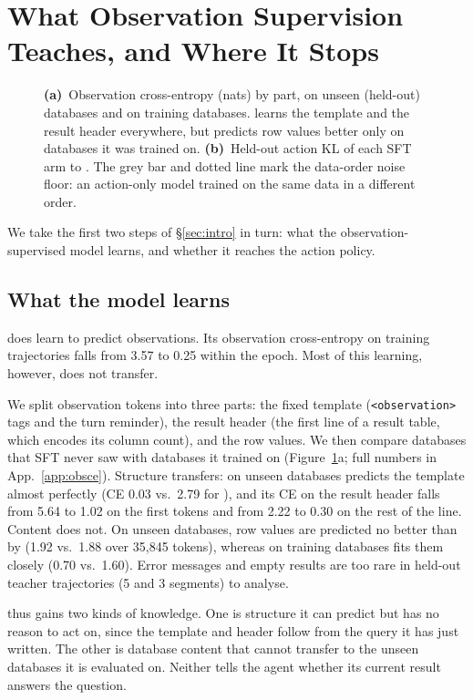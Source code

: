 \section{What Observation Supervision Teaches, and Where It Stops}
\label{sec:mechanism}

\begin{figure}[t]
\centering
{}
\caption{\textbf{(a)}~Observation cross-entropy (nats) by part, on unseen (held-out) databases and on training databases. \armB{} learns the template and the result header everywhere, but predicts row values better only on databases it was trained on. \textbf{(b)}~Held-out action KL of each SFT arm to \armA{}. The grey bar and dotted line mark the data-order noise floor: an action-only model trained on the same data in a different order.}
\label{fig:mechanism}
\end{figure}

We take the first two steps of \S\ref{sec:intro} in turn: what the observation-supervised model learns, and whether it reaches the action policy.

\subsection{What the model learns}
\label{sec:learned}
\armB{} does learn to predict observations. Its observation cross-entropy on training trajectories falls from 3.57 to 0.25 within the epoch. Most of this learning, however, does not transfer.

We split observation tokens into three parts: the fixed template (\texttt{<observation>} tags and the turn reminder), the result header (the first line of a result table, which encodes its column count), and the row values. We then compare databases that SFT never saw with databases it trained on (Figure~\ref{fig:mechanism}a; full numbers in App.~\ref{app:obsce}). Structure transfers: on unseen databases \armB{} predicts the template almost perfectly (CE 0.03 vs.\ 2.79 for \armA{}), and its CE on the result header falls from 5.64 to 1.02 on the first tokens and from 2.22 to 0.30 on the rest of the line. Content does not. On unseen databases, row values are predicted no better than by \armA{} (1.92 vs.\ 1.88 over 35,845 tokens), whereas on training databases \armB{} fits them closely (0.70 vs.\ 1.60). Error messages and empty results are too rare in held-out teacher trajectories (5 and 3 segments) to analyse.

\armB{} thus gains two kinds of knowledge. One is structure it can predict but has no reason to act on, since the template and header follow from the query it has just written. The other is database content that cannot transfer to the unseen databases it is evaluated on. Neither tells the agent whether its current result answers the question.

